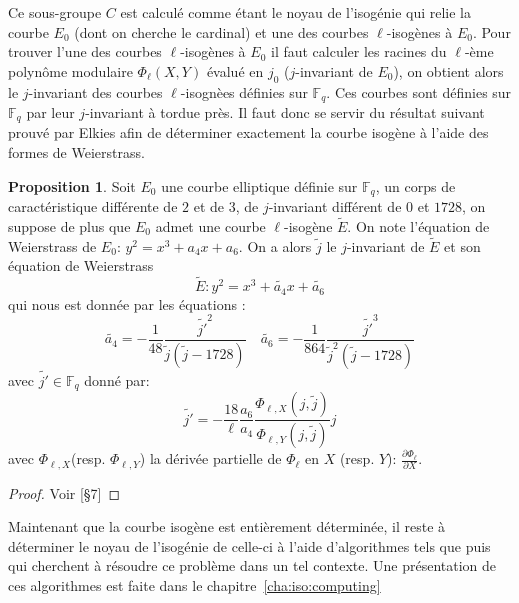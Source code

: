 \documentclass[10pt,a4paper]{book}
\theoremstyle{plain}
\theoremstyle{definition}
\theoremstyle{definition}
\theoremstyle{definition}
\newtheorem{prop}[thm]{Proposition}
\theoremstyle{definition}
\theoremstyle{remark}
\theoremstyle{remark}
\theoremstyle{definition}
\begin{document}
Ce sous-groupe $C$ est calculé comme étant le noyau de l'isogénie qui relie la courbe $E_0$ (dont on cherche le cardinal) et une des courbes $\ell$-isogènes à $E_0$. Pour trouver l'une des courbes $\ell$-isogènes à $E_0$ il faut calculer les racines du $\ell$-ème polynôme modulaire $\Phi_{\ell}(X,Y)$ évalué en $j_0$ ($j$-invariant de $E_0$), on obtient alors le $j$-invariant des courbes $\ell$-isognèes définies sur $\mathbb{F}_q$. Ces courbes sont définies sur $\mathbb{F}_q$ par leur $j$-invariant à tordue près. Il faut donc se servir du résultat suivant prouvé par Elkies afin de déterminer exactement la courbe isogène à l'aide des formes de Weierstrass.

\begin{prop}
\label{prop:elk:nor}
Soit $E_0$ une courbe elliptique définie sur $\mathbb{F}_q$, un corps de caractéristique différente de $2$ et de $3$, de $j$-invariant différent de $0$ et $1728$, on suppose de plus que $E_0$ admet une courbe $\ell$-isogène $\tilde{E}$. On note l'équation de Weierstrass de $E_0$: $y^2=x^3+a_4x+a_6$. On a alors $\tilde{j}$ le $j$-invariant de $\tilde{E}$ et son équation de Weierstrass
\begin{equation*}
\tilde{E}:y^2=x^3+\tilde{a_4}x+\tilde{a_6}
\end{equation*}
 qui nous est donnée par les équations : 
\begin{equation*}
\tilde{a_4}=-\frac{1}{48}\frac{\tilde{j'}^2}{\tilde{j}(\tilde{j}-1728)} \quad \tilde{a_6}=-\frac{1}{864}\frac{\tilde{j'}^3}{\tilde{j}^2(\tilde{j}-1728)}
\end{equation*}
avec $\tilde{j'} \in \mathbb{F}_q$ donné par:
\begin{equation*}
\tilde{j'}=-\frac{18}{\ell}\frac{a_6}{a_4}\frac{\Phi_{\ell,X}(j,\tilde{j})}{\Phi_{\ell,Y}(j,\tilde{j})}j
\end{equation*}
avec $\Phi_{\ell,X}$(resp. $\Phi_{\ell,Y}$) la dérivée partielle de $\Phi_{\ell}$ en $X$ (resp. $Y$): $\frac{\partial \Phi_{\ell}}{\partial X} $.
\end{prop} 

\begin{proof}
Voir \cite{Schoof95}[§7]
\end{proof}

Maintenant que la courbe isogène est entièrement déterminée, il reste à déterminer le noyau de l'isogénie de celle-ci à l'aide d'algorithmes tels que \cite{BMSS08}  puis \cite{Lercier-Sirvent2008} qui cherchent à résoudre ce problème dans un tel contexte. Une présentation de ces algorithmes est faite dans le chapitre~\ref{cha:iso:computing}
\end{document}
